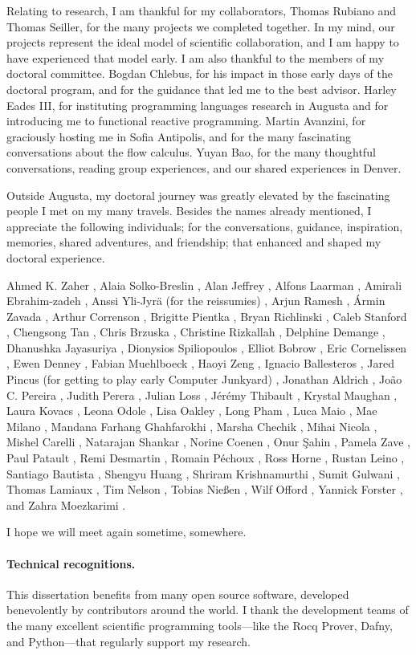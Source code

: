 Relating to research, I am thankful for my collaborators, Thomas Rubiano and Thomas Seiller, for the many projects we completed together.
In my mind, our projects represent the ideal model of scientific collaboration, and I am happy to have experienced that model early.
I am also thankful to the members of my doctoral committee.
Bogdan Chlebus, for his impact in those early days of the doctoral program, and for the guidance that led me to the best advisor.
Harley Eades III, for instituting programming languages research in Augusta and for introducing me to functional reactive programming.
Martin Avanzini, for graciously hosting me in Sofia Antipolis, and for the many fascinating conversations about the flow calculus.
Yuyan Bao, for the many thoughtful conversations, reading group experiences, and our shared experiences in Denver.

Outside Augusta, my doctoral journey was greatly elevated by the fascinating people I met on my many travels.
Besides the names already mentioned, I appreciate the following individuals;
for the conversations, guidance, inspiration, memories, shared adventures, and friendship;
that enhanced and shaped my doctoral experience.

Ahmed K. Zaher%
, Alaia Solko-Breslin%
, Alan Jeffrey%
, Alfons Laarman%
, Amirali Ebrahim\hyp{}zadeh%
, Anssi Yli-Jyrä (for the reissumies)%
, Arjun Ramesh%
, Ármin Zavada%
, Arthur Correnson%
, Brigitte Pientka%
, Bryan Richlinski%
, Caleb Stanford%
, Chengsong Tan%
, Chris Brzuska%
, Christine Rizkallah%
, Delphine Demange%
, Dhanushka Jayasuriya%
, Dionysios Spiliopoulos%
, Elliot Bobrow%
, Eric Cornelissen%
, Ewen Denney%
, Fabian Muehlboeck%
, Haoyi Zeng%
, Ignacio Ballesteros%
, Jared Pincus (for getting to play early Computer Junkyard)%
, Jonathan Aldrich%
, João C. Pereira%
, Judith Perera%
, Julian Loss%
, Jérémy Thibault%
, Krystal Maughan%
, Laura Kovacs%
, Leona Odole%
, Lisa Oakley%
, Long Pham%
, Luca Maio%
, Mae Milano%
, Mandana Farhang Ghahfarokhi%
, Marsha Chechik%
, Mihai Nicola%
, Mishel Carelli%
, Natarajan Shankar%
, Norine Coenen%
, Onur Şahin%
, Pamela Zave%
, Paul Patault%
, Remi Desmartin%
, Romain Péchoux%
, Ross Horne%
, Rustan Leino%
, Santiago Bautista%
, Shengyu Huang%
, Shriram Krishnamurthi%
, Sumit Gulwani%
, Thomas Lamiaux%
, Tim Nelson%
, Tobias Nießen%
, Wilf Offord%
, Yannick Forster%
, and Zahra Moezkarimi%
.

I hope we will meet again sometime, somewhere.

\paragraph*{Technical recognitions.}
This dissertation benefits from many open source software, developed benevolently by contributors around the world.
I thank the development teams of the many excellent scientific programming tools---like the Rocq Prover, Dafny, and Python---that regularly support my research.

